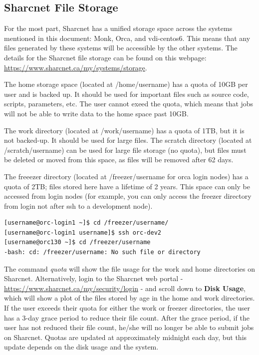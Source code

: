 \documentclass[12pt]{article}
\begin{document}
\subsection{Sharcnet File Storage}
\quad For the most part, Sharcnet has a unified storage space across the systems mentioned in this document: Monk, Orca, and vdi-centos6. This means that any files generated by these systems will be accessible by the other systems. The details for the Sharcnet file storage can be found on this webpage: \url{https://www.sharcnet.ca/my/systems/storage}. 

\quad The home storage space (located at /home/username) has a quota of 10GB per user and is backed up. It should be used for important files such as source code, scripts, parameters, etc. The user cannot exeed the quota, which means that jobs will not be able to write data to the home space past 10GB. 

\quad The work directory (located at /work/username) has a quota of 1TB, but it is not backed-up. It should be used for large files. The scratch directory (located at /scratch/username) can be used for large file storage (no quota), but files must be deleted or moved from this space, as files will be removed after 62 days. 

\quad The freeezer directory (located at /freezer/username for orca login nodes) has a quota of 2TB; files stored here have a lifetime of 2 years. This space can only be accessed from login nodes (for example, you can only access the freezer directory from login not after ssh to a development node).

\begin{lstlisting}[numbers=none]
[username@orc-login1 ~]$ cd /freezer/username/
[username@orc-login1 username]$ ssh orc-dev2
[username@orc130 ~]$ cd /freezer/username
-bash: cd: /freezer/username: No such file or directory

\end{lstlisting}
\quad The command \textit{quota} will show the file usage for the work and home directories on Sharcnet. Alternatively, login to the Sharcnet web portal - \url{https://www.sharcnet.ca/my/security/login} - and scroll down to \textbf{Disk Usage}, which will show a plot of the files stored by age in the home and work directories. If the user exceeds their quota for either the work or freezer directories, the user has a 3-day grace period to reduce their file count. After the grace period, if the user has not reduced their file count, he/she will no longer be able to submit jobs on Sharcnet. Quotas are updated at approximately midnight each day, but this update depends on the disk usage and the system.
\end{document}
